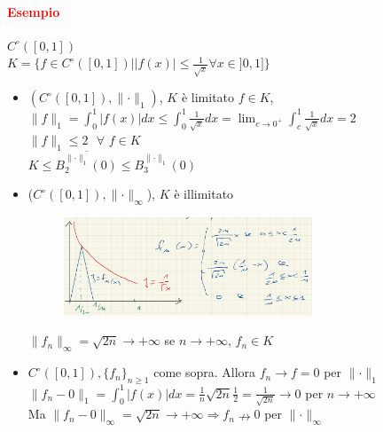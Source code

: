 \documentclass{article}
\begin{document}
\paragraph{\textcolor{red}{Esempio}}
$C^\circ ([0,1])$\\
$K=\{f \in C^\circ ([0,1])| |f(x)|\leq \frac{1}{\sqrt{x}}\forall x \in  ]0,1]\}$
\begin{itemize}
    \item $(C^\circ([0,1]),\parallel\cdot\parallel_1)$, $K$ è limitato $f \in K$, $\parallel f \parallel_1 = \int_{0}^{1}|f(x)|dx \leq \int_{0}^{1}\frac{1}{\sqrt{x}}dx=\lim_{c \rightarrow 0^+} \int_{c}^{1} \frac{1}{\sqrt{x}}dx=2$\\
    $\parallel f \parallel_1 \leq 2 \,\,\,\, \forall \,\, f \in K$\\
    $K \leq \overline{B_{2}^{\parallel\cdot \parallel_1}(0)}\leq B_{3}^{\parallel\cdot \parallel_1}(0)$
    \item ($C^\circ([0,1]), \parallel \cdot \parallel_\infty$), $K$ è illimitato\\
    \begin{figure}[!h]
        \centering
        \includegraphics[width=0.7\textwidth]{Screenshot from 2023-03-28 20-48-27}
    \end{figure}
    
    $\parallel f_n \parallel_\infty = \sqrt{2n}\rightarrow +\infty$ se $n\rightarrow +\infty$, $f_n \in K$
    \item $C^\circ ([0,1]), \{f_n\}_{n\geq 1}$ come sopra. Allora $f_n \rightarrow f=0$ per $\parallel \cdot \parallel_1$\\
    $\parallel f_n -0 \parallel_1 =\int_{0}^{1} |f(x)|dx =\frac{1}{n} \sqrt{2n}\frac{1}{2}= \frac{1}{\sqrt{2n}} \rightarrow 0$ per $n \rightarrow +\infty$\\
    Ma $\parallel f_n -0 \parallel_\infty = \sqrt{2n} \rightarrow +\infty \Rightarrow f_n \nrightarrow 0$ per $\parallel \cdot \parallel_\infty$
\end{itemize}
\end{document}

